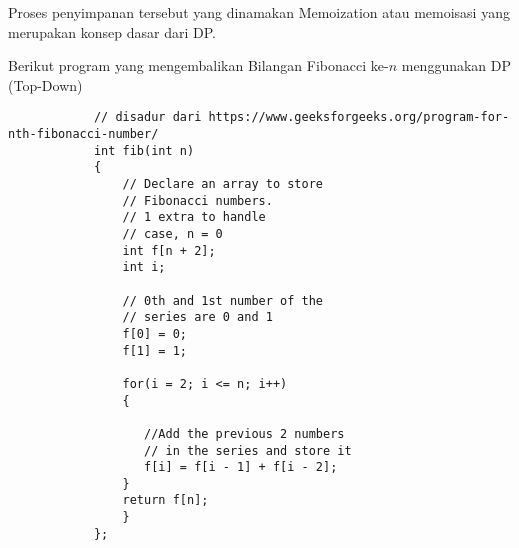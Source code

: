 \documentclass[11pt]{scrartcl}
\begin{document}
		    Proses penyimpanan tersebut yang dinamakan Memoization atau memoisasi yang merupakan konsep dasar dari DP.
		    
		    Berikut program yang mengembalikan Bilangan Fibonacci ke-$n$ menggunakan DP (Top-Down)
		    \begin{lstlisting}
		    // disadur dari https://www.geeksforgeeks.org/program-for-nth-fibonacci-number/
		    int fib(int n)
		    {
		        // Declare an array to store
		        // Fibonacci numbers.
		        // 1 extra to handle
		        // case, n = 0
		        int f[n + 2];
		        int i;
		     
		        // 0th and 1st number of the
		        // series are 0 and 1
		        f[0] = 0;
		        f[1] = 1;
		     
		        for(i = 2; i <= n; i++)
		        {
		             
		           //Add the previous 2 numbers
		           // in the series and store it
		           f[i] = f[i - 1] + f[i - 2];
		        }
		        return f[n];
		        }
		    };
		    \end{lstlisting}
		    
		    \newpage
\end{document}
